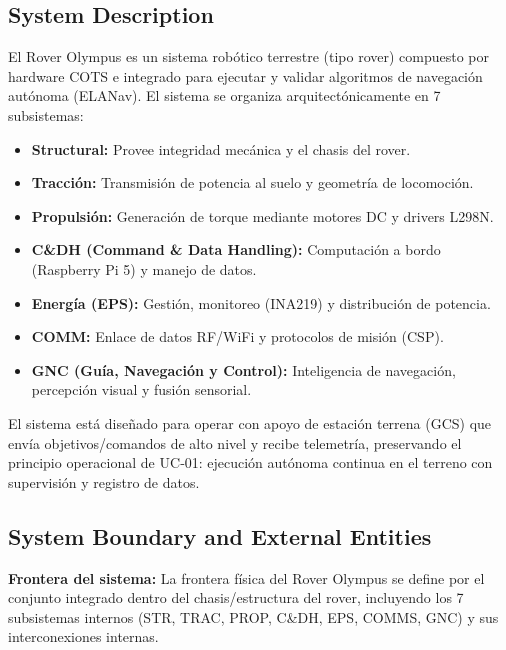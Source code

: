 \subsection{System Description}\label{subsec:system_description}

El Rover Olympus es un sistema robótico terrestre (tipo rover) compuesto por hardware COTS e integrado para ejecutar y validar algoritmos de navegación autónoma (ELANav). El sistema se organiza arquitectónicamente en 7 subsistemas:
\begin{itemize}
    \item \textbf{Structural:} Provee integridad mecánica y el chasis del rover.
    \item \textbf{Tracción:} Transmisión de potencia al suelo y geometría de locomoción.
    \item \textbf{Propulsión:} Generación de torque mediante motores DC y drivers L298N.
    \item \textbf{C\&DH (Command \& Data Handling):} Computación a bordo (Raspberry Pi 5) y manejo de datos.
    \item \textbf{Energía (EPS):} Gestión, monitoreo (INA219) y distribución de potencia.
    \item \textbf{COMM:} Enlace de datos RF/WiFi y protocolos de misión (CSP).
    \item \textbf{GNC (Guía, Navegación y Control):} Inteligencia de navegación, percepción visual y fusión sensorial. \cite{omg_sysml_mbse, nasa_cm, segoldmine_ppi}
\end{itemize}
El sistema está diseñado para operar con apoyo de estación terrena (GCS) que envía objetivos/comandos de alto nivel y recibe telemetría, preservando el principio operacional de UC‑01: ejecución autónoma continua en el terreno con supervisión y registro de datos. \cite{omg_sysml_mbse, segoldmine_ppi, nasa_cm} 

\subsection{System Boundary and External Entities}\label{subsec:system_boundary}

\textbf{Frontera del sistema:} La frontera física del Rover Olympus se define por el conjunto integrado dentro del chasis/estructura del rover, incluyendo los 7 subsistemas internos (STR, TRAC, PROP, C\&DH, EPS, COMMS, GNC) y sus interconexiones internas. \cite{omg_sysml_mbse, nasa_cm, segoldmine_ppi}  

